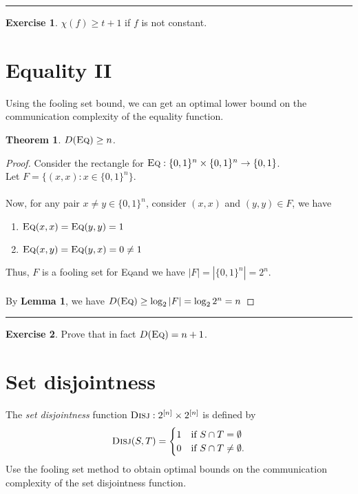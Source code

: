 \documentclass[11pt,oneside]{book}
\theoremstyle{plain}
\newtheorem{theorem}{Theorem}
\theoremstyle{definition}
\newtheorem{exercise}{Exercise}
\theoremstyle{plain}
\newcommand{\Disj}{\textsc{Disj}}
\newcommand{\Eq}{\textsc{Eq}}
\newcommand{\exercises}{\bigskip \noindent\rule{8cm}{0.4pt} \medskip}
\begin{document}
\exercises
0
\begin{exercise}
	$\chi(f) \ge t+1$ if $f$ is not constant.
\end{exercise}
 \section{Equality II}

Using the fooling set bound, we can get an optimal lower bound on the communication complexity of the equality function.

\begin{theorem}
	$D(\Eq) \ge n$.
\end{theorem}

\begin{proof}
	Consider the rectangle for $\Eq : \{0,1\}^n \times \{0,1\}^n \rightarrow \{0,1\}$.\\
	Let $F = \{(x,x): x \in \{0,1\}^n\}$. \\
	\\
	Now, for any pair $x \neq y \in \{0,1\}^n$, consider $(x,x)$ and $(y,y) \in F$, we have 
	\begin{enumerate}
		\item $\Eq(x,x) = \Eq(y,y) = 1$
		\item $\Eq(x,y) = \Eq(y,x) = 0 \neq 1$
	\end{enumerate} 
	Thus, $F$ is a fooling set for \Eq and we have $|F| = |\{0,1\}^n| = 2^n$. \\ 
	\\
	By \textbf{Lemma 1}, we have $D(\Eq) \ge \log_2 |F| = \log_2 2^n = n$
\end{proof}

\exercises

\begin{exercise}
	Prove that in fact $D(\Eq) = n+1$.
\end{exercise}


 \section{Set disjointness}

The \emph{set disjointness} function $\Disj : 2^{[n]} \times 2^{[n]}$ is defined by
\[
\Disj(S,T) = \begin{cases}
1 & \mbox{if } S \cap T = \emptyset \\
0 & \mbox{if } S \cap T \neq \emptyset.
\end{cases}
\]
Use the fooling set method to obtain optimal bounds on the communication complexity of the set disjointness function.
\end{document}
